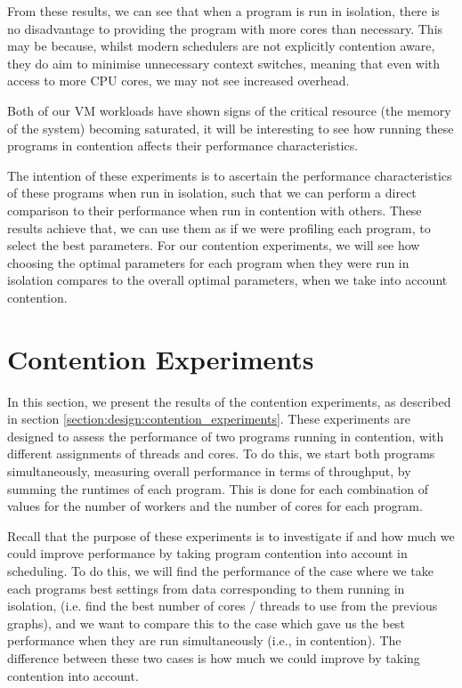 From these results, we can see that when a program is run in isolation, there is no disadvantage to providing the program with more cores than necessary. This may be because, whilst modern schedulers are not explicitly contention aware, they do aim to minimise unnecessary context switches, meaning that even with access to more CPU cores, we may not see increased overhead.

Both of our VM workloads have shown signs of the critical resource (the memory of the system) becoming saturated, it will be interesting to see how running these programs in contention affects their performance characteristics.

The intention of these experiments is to ascertain the performance characteristics of these programs when run in isolation, such that we can perform a direct comparison to their performance when run in contention with others. These results achieve that, we can use them as if we were profiling each program, to select the best parameters. For our contention experiments, we will see how choosing the optimal parameters for each program when they were run in isolation compares to the overall optimal parameters, when we take into account contention.



\section{Contention Experiments}
\label{section:results:contention_experiments}

In this section, we present the results of the contention experiments, as described in section \ref{section:design:contention_experiments}. These experiments are designed to assess the performance of two programs running in contention, with different assignments of threads and cores. To do this, we start both programs simultaneously, measuring overall performance in terms of throughput, by summing the runtimes of each program. This is done for each combination of values for the number of workers and the number of cores for each program.

Recall that the purpose of these experiments is to investigate if and how much we could improve performance by taking program contention into account in scheduling. To do this, we will find the performance of the case where we take each programs best settings from data corresponding to them running in isolation, (i.e. find the best number of cores / threads to use from the previous graphs), and we want to compare this to the case which gave us the best performance when they are run simultaneously (i.e., in contention). The difference between these two cases is how much we could improve by taking contention into account.

